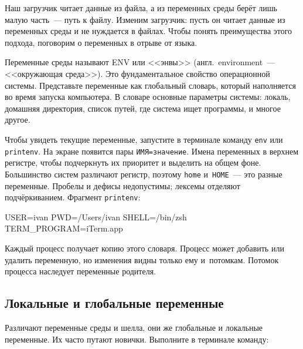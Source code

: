
Наш загрузчик читает данные из файла, а из переменных среды берёт лишь малую
часть~--- путь к файлу. Изменим загрузчик: пусть он читает данные из переменных
среды и не нуждается в файлах. Чтобы понять преимущества этого подхода,
поговорим о переменных в отрыве от языка.

Переменные среды называют ENV или <<энвы>> (англ.~environment~--- <<окружающая
среда>>). Это фундаментальное свойство операционной системы. Представьте
переменные как глобальный словарь, который наполняется во время запуска
компьютера. В словаре основные параметры системы: локаль, домашняя директория,
список путей, где система ищет программы, и многое другое.


Чтобы увидеть текущие переменные, запустите в терминале команду \verb|env| или
\verb|printenv|. На экране появится пары \verb|ИМЯ=значение|. Имена переменных в
верхнем регистре, чтобы подчеркнуть их приоритет и выделить на общем
фоне. Большинство систем различают регистр, поэтому \verb|home|
и~\verb|HOME|~--- это разные переменные. Пробелы и дефисы недопустимы; лексемы
отделяют подчёркиванием. Фрагмент \verb|printenv|:

\begin{english}
  \begin{bash}
USER=ivan
PWD=/Users/ivan
SHELL=/bin/zsh
TERM_PROGRAM=iTerm.app
  \end{bash}
\end{english}

Каждый процесс получает копию этого словаря. Процесс может добавить или удалить
переменную, но изменения видны только ему и~потомкам. Потомок процесса наследует
переменные родителя.

\subsection{Локальные и глобальные переменные}


Различают переменные среды и шелла, они же глобальные и локальные переменные. Их
часто путают новички. Выполните в терминале команду:

\begin{english}
\end{english}

